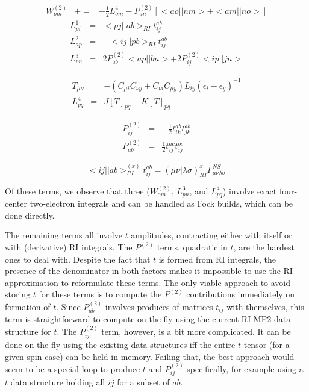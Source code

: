 \documentclass[fleqn,12pt]{article}
\newcommand{\half}{\frac{1}{2}}
\newcommand{\bra}{<\!}
\newcommand{\ket}{\!>}
\newcommand{\tijab}{{t_{ij}^{ab}}}
\newcommand{\Ptwo}{P^{(2)}}
\newcommand{\Wtwo}{W^{(2)}}
\newcommand{\intari}[2]{\bra #1 || #2 \ket_{RI}}
\newcommand{\intmri}[2]{( #1 | #2 )_{RI}}
\begin{document}
\begin{changebar}
\begin{eqnarray}
  \Wtwo_{om} & += & -\half L^4_{om}  - \Ptwo_{an} \left[ \bra ao||nm \ket
    + \bra am||no \ket \right]
\end{eqnarray}
\begin{eqnarray}
  L^1_{pi} & = & \intari{pj}{ab} \tijab \\
  L^2_{ap} & = & - \intari{ij}{pb} \tijab \\
  L^3_{pn} & = & 2 \Ptwo_{ab} \bra ap || bn \ket + 2 \Ptwo_{ij} \bra ip
  || jn \ket 
\end{eqnarray}

\begin{eqnarray}
  T_{\mu \nu} & = & - \left(C_{\mu i} C_{\nu y} + C_{\nu i} C_{\mu y}
  \right) L_{iy} \left( \epsilon_i - \epsilon_y \right)^{-1} \\
   L^4_{pq} & = & J[T]_{pq} - K[T]_{pq}
\end{eqnarray}

\begin{eqnarray}
  \Ptwo_{ij} & = & -\half t_{ik}^{ab} t_{jk}^{ab} \\
  \Ptwo_{ab} & = & \half t_{ij}^{ac} t_{ij}^{bc} 
\end{eqnarray}

\begin{equation}
\intari{ij}{ab}^{(x)} \tijab 
 = \intmri{\mu \nu}{\lambda \sigma}^{x} \Gamma^{NS}_{\mu\nu\lambda\sigma}
\end{equation}

Of these terms, we observe that three ($\Wtwo_{om}$, $L^{3}_{pn}$, and
$L^{4}_{pq}$) involve exact four-center two-electron integrals and can
be handled as Fock builds, which can be done directly.

The remaining terms all involve $t$ amplitudes, contracting either
with itself or with (derivative) RI integrals.  The $P^{(2)}$ terms,
quadratic in $t$, are the hardest ones to deal with.  Despite the fact
that $t$ is formed from RI integrals, the presence of the denominator
in both factors makes it impossible to use the RI approximation to
reformulate these terms.  The only viable approach to avoid storing
$t$ for these terms is to compute the $P^{(2)}$ contributions
immediately on formation of $t$.  Since $P^{(2)}_{ab}$ involves
produces of matrices $t_{ij}$ with themselves, this term is
straightforward to compute on the fly using the current RI-MP2 data
structure for $t$.  The $P^{(2)}_{ij}$ term, however, is a bit more
complicated.  It can be done on the fly using the existing data
structures iff the entire $t$ tensor (for a given spin case) can be
held in memory.  Failing that, the best approach would seem to be a
special loop to produce $t$ and $P^{(2)}_{ij}$ specifically, for
example using a $t$ data structure holding all $ij$ for a subset of
$ab$.


\end{changebar}
\end{document}
